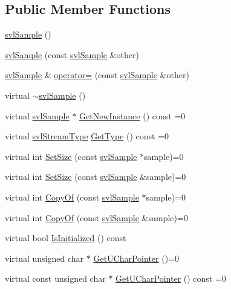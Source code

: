 \subsection*{Public Member Functions}
\begin{DoxyCompactItemize}
\item 
\hyperlink{classsvl_sample_a4e072ee82d46decf6d5ac224a2c04b78}{svl\-Sample} ()
\item 
\hyperlink{classsvl_sample_a1a7bf4e2ef82f29f9e1f456da653b106}{svl\-Sample} (const \hyperlink{classsvl_sample}{svl\-Sample} \&other)
\item 
\hyperlink{classsvl_sample}{svl\-Sample} \& \hyperlink{classsvl_sample_a3048daed69fc0bce5e48db36d924ddde}{operator=} (const \hyperlink{classsvl_sample}{svl\-Sample} \&other)
\item 
virtual \hyperlink{classsvl_sample_ac5d4e50a98b75d7338ecd470a12e6ed9}{$\sim$svl\-Sample} ()
\item 
virtual \hyperlink{classsvl_sample}{svl\-Sample} $\ast$ \hyperlink{classsvl_sample_a1f6cc4075c22bbaa4a4225f1079bca59}{Get\-New\-Instance} () const =0
\item 
virtual \hyperlink{svl_definitions_8h_aa00696d338a58db361335a01fd11e122}{svl\-Stream\-Type} \hyperlink{classsvl_sample_ab2ab29d5dcd80646f29955bc103cf927}{Get\-Type} () const =0
\item 
virtual int \hyperlink{classsvl_sample_a4a4c91f6bca2ece232fbbc745cf710f4}{Set\-Size} (const \hyperlink{classsvl_sample}{svl\-Sample} $\ast$sample)=0
\item 
virtual int \hyperlink{classsvl_sample_a10f80eb24f0d8d2eba304dc6e3c46252}{Set\-Size} (const \hyperlink{classsvl_sample}{svl\-Sample} \&sample)=0
\item 
virtual int \hyperlink{classsvl_sample_aa80a261472f0e0dd1bf7ecd25ee40bda}{Copy\-Of} (const \hyperlink{classsvl_sample}{svl\-Sample} $\ast$sample)=0
\item 
virtual int \hyperlink{classsvl_sample_a79831d7302d638ba99be09ba19ebf7b6}{Copy\-Of} (const \hyperlink{classsvl_sample}{svl\-Sample} \&sample)=0
\item 
virtual bool \hyperlink{classsvl_sample_adf73a72c661e6df3c5f51a36c55040bb}{Is\-Initialized} () const 
\item 
virtual unsigned char $\ast$ \hyperlink{classsvl_sample_a1d6d0bcdc9c59c719151fdef2b41fb07}{Get\-U\-Char\-Pointer} ()=0
\item 
virtual const unsigned char $\ast$ \hyperlink{classsvl_sample_a1709332c9744a208763d49707f9a180b}{Get\-U\-Char\-Pointer} () const =0

\end{DoxyCompactItemize}
